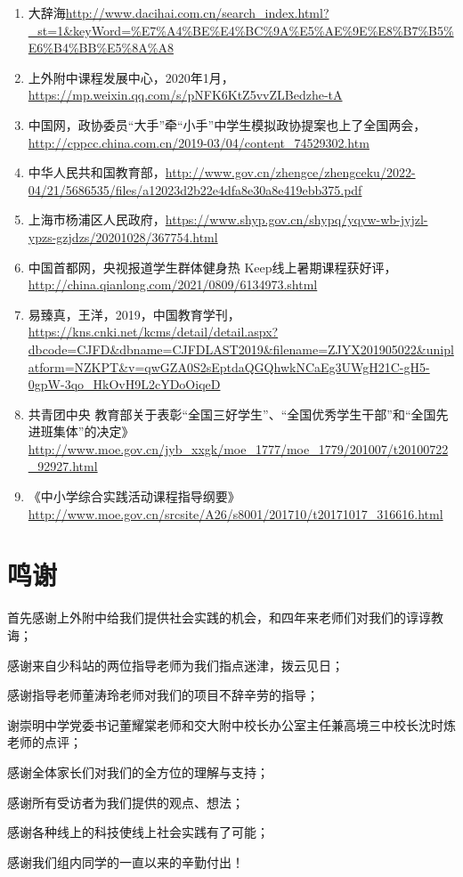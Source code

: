 \documentclass[12pt,UTF8]{ctexart}
\begin{document}
\begin{enumerate}[1.]
\item 大辞海\url{http://www.dacihai.com.cn/search_index.html?_st=1&keyWord=\%E7\%A4\%BE\%E4\%BC\%9A\%E5\%AE\%9E\%E8\%B7\%B5\%E6\%B4\%BB\%E5\%8A\%A8}
\item 上外附中课程发展中心，2020年1月，\url{https://mp.weixin.qq.com/s/pNFK6KtZ5vvZLBedzhe-tA}
\item 中国网，政协委员“大手”牵“小手”中学生模拟政协提案也上了全国两会，\url{http://cppcc.china.com.cn/2019-03/04/content_74529302.htm}
\item 中华人民共和国教育部，\url{http://www.gov.cn/zhengce/zhengceku/2022-04/21/5686535/files/a12023d2b22e4dfa8e30a8e419ebb375.pdf}
\item 上海市杨浦区人民政府，\url{https://www.shyp.gov.cn/shypq/yqyw-wb-jyjzl-ypzs-gzjdzs/20201028/367754.html}
\item 中国首都网，央视报道学生群体健身热 Keep线上暑期课程获好评，\url{http://china.qianlong.com/2021/0809/6134973.shtml}
\item 易臻真，王洋，2019，中国教育学刊，\url{https://kns.cnki.net/kcms/detail/detail.aspx?dbcode=CJFD&dbname=CJFDLAST2019&filename=ZJYX201905022&uniplatform=NZKPT&v=qwGZA0S2sEptdaQGQhwkNCaEg3UWgH21C-gH5-0gpW-3qo_HkOvH9L2cYDoOiqeD}
\item 共青团中央 教育部关于表彰“全国三好学生”、“全国优秀学生干部”和“全国先进班集体”的决定》\url{http://www.moe.gov.cn/jyb_xxgk/moe_1777/moe_1779/201007/t20100722_92927.html}
\item 《中小学综合实践活动课程指导纲要》\url{http://www.moe.gov.cn/srcsite/A26/s8001/201710/t20171017_316616.html}
\end{enumerate}

\newpage

\section{鸣谢}
首先感谢上外附中给我们提供社会实践的机会，和四年来老师们对我们的谆谆教诲；
\par {感谢来自少科站的两位指导老师为我们指点迷津，拨云见日；}
\par {感谢指导老师董涛玲老师对我们的项目不辞辛劳的指导；}
\par {谢崇明中学党委书记董耀棠老师和交大附中校长办公室主任兼高境三中校长沈时炼老师的点评；}
\par {感谢全体家长们对我们的全方位的理解与支持；}
\par {感谢所有受访者为我们提供的观点、想法；}
\par {感谢各种线上的科技使线上社会实践有了可能；}
\par {感谢我们组内同学的一直以来的辛勤付出！} 
\end{document}
